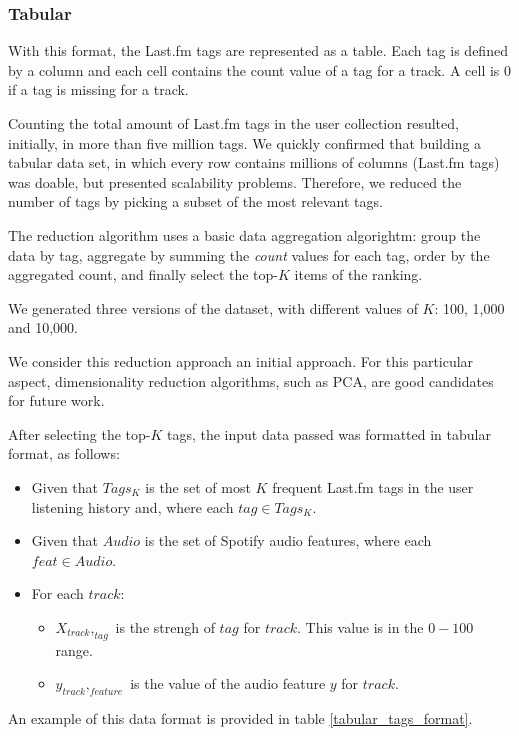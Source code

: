 \documentclass[sn-mathphys]{sn-jnl}%
\theoremstyle{thmstyleone}%
\theoremstyle{thmstyletwo}%
\theoremstyle{thmstylethree}%
\begin{document}
\subsubsection{Tabular}
With this format, the Last.fm tags are represented as a table.
Each tag is defined by a column and each cell contains the count value of a tag for a track.
A cell is 0 if a tag is missing for a track.

Counting the total amount of Last.fm tags in the user collection resulted, initially, in more than five million tags.
We quickly confirmed that building a tabular data set, in which every row contains millions of columns (Last.fm tags)
was doable, but presented scalability problems.
Therefore, we reduced the number of tags by picking a subset of the most relevant tags.

The reduction algorithm uses a basic data aggregation algorightm: group the data by tag, aggregate by summing the \emph{count} values for each tag,
order by the aggregated count, and finally select the top-$K$ items of the ranking.

We generated three versions of the dataset, with different values of $K$: 100, 1,000 and 10,000.

We consider this reduction approach an initial approach.
For this particular aspect, dimensionality reduction algorithms, such as PCA, are good candidates for future work.

After selecting the top-$K$ tags, the input data passed was formatted in tabular format, as follows:

\begin{itemize}
      \item Given that $Tags_{K}$ is the set of most $K$ frequent Last.fm tags in the user listening history
            and, where each $tag \in Tags_{K}$.
      \item Given that $Audio$ is the set of Spotify audio features, where each $feat \in Audio$.
      \item For each $track$:
      \begin{itemize}
            \item $X_{track},_{tag}$ is the strengh of $tag$ for $track$. This value is in the $0-100$ range.
            \item $y_{track},_{feature}$ is the value of the audio feature $y$ for $track$.
      \end{itemize}
\end{itemize}

An example of this data format is provided in table \ref{tabular_tags_format}.
\end{document}
